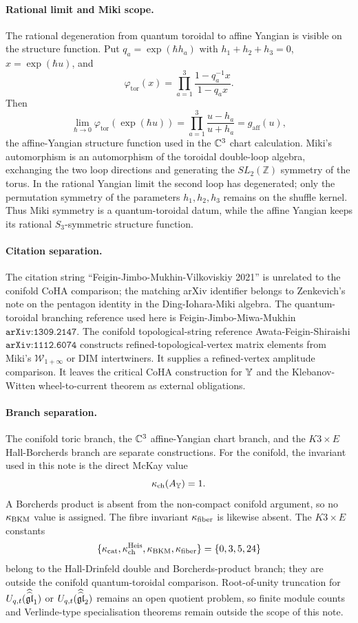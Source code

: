 \paragraph{Rational limit and Miki scope.}
The rational degeneration from quantum toroidal to affine Yangian is
visible on the structure function.  Put \(q_a=\exp(\hbar h_a)\) with
\(h_1+h_2+h_3=0\), \(x=\exp(\hbar u)\), and
\[
  \varphi_{\mathrm{tor}}(x)
  =
  \prod_{a=1}^{3}
  \frac{1-q_a^{-1}x}{1-q_a x}.
\]
Then
\[
  \lim_{\hbar\to 0}\varphi_{\mathrm{tor}}(\exp(\hbar u))
  =
  \prod_{a=1}^{3}\frac{u-h_a}{u+h_a}
  =
  g_{\mathrm{aff}}(u),
\]
the affine-Yangian structure function used in the \(\mathbb{C}^3\) chart
calculation.  Miki's automorphism is an automorphism of the toroidal
double-loop algebra, exchanging the two loop directions and generating
the \(SL_2(\mathbb Z)\) symmetry of the torus.  In the rational
Yangian limit the second loop has degenerated; only the permutation
symmetry of the parameters \(h_1,h_2,h_3\) remains on the shuffle
kernel.  Thus Miki symmetry is a quantum-toroidal datum, while the
affine Yangian keeps its rational \(S_3\)-symmetric structure function.

\paragraph{Citation separation.}
The citation string
``Feigin-Jimbo-Mukhin-Vilkoviskiy 2021'' is unrelated to the conifold
CoHA comparison; the matching arXiv identifier belongs to Zenkevich's
note on the pentagon identity in the Ding-Iohara-Miki algebra.  The
quantum-toroidal branching reference used here is
Feigin-Jimbo-Miwa-Mukhin \(\texttt{arXiv:1309.2147}\).  The conifold
topological-string reference Awata-Feigin-Shiraishi
\(\texttt{arXiv:1112.6074}\) constructs refined-topological-vertex
matrix elements from Miki's \(\mathcal W_{1+\infty}\) or DIM
intertwiners.  It supplies a refined-vertex amplitude comparison.  It
leaves the critical CoHA construction for \(\mathbb{Y}\) and the
Klebanov-Witten wheel-to-current theorem as external obligations.

\paragraph{Branch separation.}
The conifold toric branch, the \(\mathbb{C}^3\) affine-Yangian chart branch,
and the \(K3\times E\) Hall-Borcherds branch are separate constructions.
For the conifold, the invariant used in this note is the direct McKay
value
\[
  \kappa_{\mathrm{ch}}(A_{\mathbb{Y}})=1 .
\]
A Borcherds product is absent from the non-compact conifold argument,
so no \(\kappa_{\mathrm{BKM}}\) value is assigned.  The fibre invariant \(\kappa_{\mathrm{fiber}}\) is
likewise absent.  The \(K3\times E\) constants
\[
  \{\kappa_{\mathrm{cat}},\kappa_{\mathrm{ch}}^{\mathrm{Heis}},\kappa_{\mathrm{BKM}},\kappa_{\mathrm{fiber}}\}
  =
  \{0,3,5,24\}
\]
belong to the Hall-Drinfeld double and Borcherds-product branch; they
are outside the conifold quantum-toroidal comparison.  Root-of-unity
truncation for \(U_{q,t}(\widehat{\widehat{\mathfrak{gl}}}_1)\) or
\(U_{q,t}(\widehat{\widehat{\mathfrak{gl}}}_2)\) remains an open quotient problem,
so finite module counts and Verlinde-type specialisation theorems remain
outside the scope of this note.

